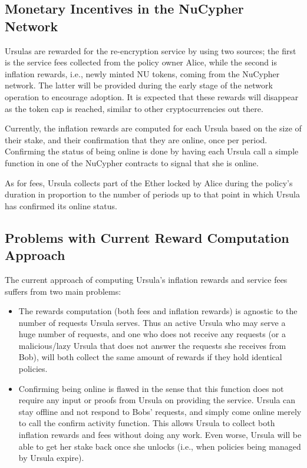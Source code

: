 \subsection{Monetary Incentives in the NuCypher Network}
Ursulas are rewarded for the re-encryption service by using two sources; 
the first is the service fees collected from the policy  
owner Alice, while the second is inflation rewards, i.e., newly minted
NU tokens, coming from the NuCypher network. The latter will be provided during the 
early stage of the network operation to encourage 
adoption. It is expected that these rewards will disappear as the token cap is 
reached, similar to other cryptocurrencies out there.


Currently, the inflation rewards are computed for each Ursula based on the size of their stake, and their confirmation that they are online, once per period. Confirming the status of being online is done by having each Ursula call a 
simple function in one of the NuCypher contracts to signal that she is online.

As for fees, Ursula collects part of the Ether locked by Alice during the policy's duration in proportion to the number of periods up to that point in which Ursula has confirmed its online status. 


\subsection{Problems with Current Reward Computation Approach}
The current approach of computing Ursula's inflation rewards and service fees suffers from two
main problems:
\begin{itemize}
\setlength{\itemsep}{0pt}
\item The rewards computation (both fees and inflation rewards) is agnostic to the number of 
requests Ursula serves. Thus an active Ursula who may serve a huge number of 
requests, and one who does not receive any requests (or a
malicious/lazy Ursula that does not answer the requests she receives from Bob), will 
both collect the same amount of rewards if they hold identical policies.

\item Confirming being online is flawed in the sense that this function does 
not require any input or proofs from Ursula on providing the service. Ursula 
can stay offline and not respond to Bobs' requests, and simply come online merely to call the confirm activity
function. This allows Ursula to collect both inflation rewards 
and fees without doing any work. Even worse, Ursula will be able to get her stake back once she unlocks (i.e., when policies being managed by Ursula expire). 
\end{itemize}



